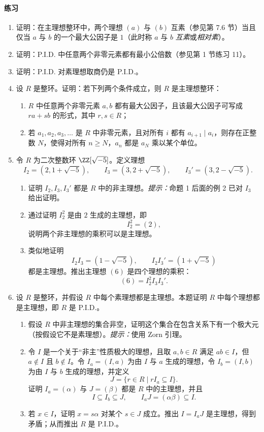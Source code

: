 \paragraph{练习}
\begin{enumerate}[label=\arabic*.]
	\item 证明：在主理想整环中，两个理想 $(a)$ 与 $(b)$ 互素（参见第 7.6 节）当且仅当 $a$ 与 $b$ 的一个最大公因子是 $1$（此时称 $a$ 与 $b$ \emph{互素}或\emph{相对素}）。
	
	\item 证明：P.I.D. 中任意两个非零元素都有最小公倍数（参见第 1 节练习 11）。
	
	\item 证明：P.I.D. 对素理想取商仍是 P.I.D.。
	
	\item 设 $R$ 是整环。证明：若下列两个条件成立，则 $R$ 是主理想整环：
	\begin{enumerate}[label=(\roman*)]
		\item $R$ 中任意两个非零元素 $a,b$ 都有最大公因子，且该最大公因子可写成 $ra+sb$ 的形式，其中 $r,s\in R$；
		\item 若 $a_1,a_2,a_3,\ldots$ 是 $R$ 中非零元素，且对所有 $i$ 都有 $a_{i+1}\mid a_i$，则存在正整数 $N$，使得对所有 $n\geq N$，$a_n$ 都是 $a_N$ 乘以某个单位。
	\end{enumerate}
	
	\item 令 $R$ 为二次整数环 $\ZZ[\sqrt{-5}]$。定义理想
	\[
	I_2=(2,1+\sqrt{-5}),\qquad
	I_3=(3,2+\sqrt{-5}),\qquad
	I_3'=(3,2-\sqrt{-5}).
	\]
	\begin{enumerate}[label=(\alph*)]
		\item 证明 $I_2,I_3,I_3'$ 都是 $R$ 中的非主理想。\emph{提示：}命题 1 后面的例 2 已对 $I_3$ 给出证明。
		\item 通过证明 $I_2^2$ 是由 $2$ 生成的主理想，即
		\[
		I_2^2=(2),
		\]
		说明两个非主理想的乘积可以是主理想。
		\item 类似地证明
		\[
		I_2I_3=(1-\sqrt{-5}),\qquad I_2I_3'=(1+\sqrt{-5})
		\]
		都是主理想。推出主理想 $(6)$ 是四个理想的乘积：
		\[
		(6)=I_2^2I_3I_3'.
		\]
	\end{enumerate}
	
	\item 设 $R$ 是整环，并假设 $R$ 中每个素理想都是主理想。本题证明 $R$ 中每个理想都是主理想，即 $R$ 是 P.I.D.。
	\begin{enumerate}[label=(\alph*)]
		\item 假设 $R$ 中非主理想的集合非空，证明这个集合在包含关系下有一个极大元（按假设它不是素理想）。\emph{提示：}使用 Zorn 引理。
		\item 令 $I$ 是一个关于“非主”性质极大的理想，且取 $a,b\in R$ 满足 $ab\in I$，但 $a\notin I$ 且 $b\notin I$。令 $I_a=(I,a)$ 为由 $I$ 与 $a$ 生成的理想，令 $I_b=(I,b)$ 为由 $I$ 与 $b$ 生成的理想，并定义
		\[
		J=\{r\in R\mid rI_a\subseteq I\}.
		\]
		证明 $I_a=(\alpha)$ 与 $J=(\beta)$ 都是 $R$ 中的主理想，并且
		\[
		I\subseteq I_b\subseteq J,
		\qquad I_aJ=(\alpha\beta)\subseteq I.
		\]
		\item 若 $x\in I$，证明 $x=s\alpha$ 对某个 $s\in J$ 成立。推出 $I=I_aJ$ 是主理想，得到矛盾；从而推出 $R$ 是 P.I.D.。
	\end{enumerate}
	

\end{enumerate}
